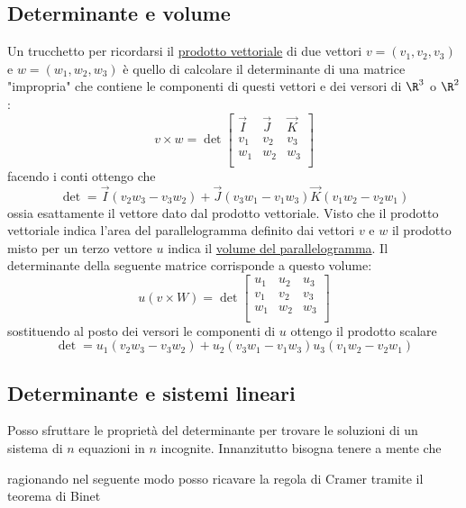 \subsection{Determinante e volume}
Un trucchetto per ricordarsi il \underline{prodotto vettoriale} di due vettori $ v= \left( v_1,v_2,v_3 \right)  $ e $ w = \left( w_1,w_2,w_3 \right)  $ è quello di calcolare il determinante di una matrice "impropria" che contiene le componenti di questi vettori e dei versori di $ \R^{3} $ o $ \R^{2} $:
\[
	v\times w = \det
	\begin{bmatrix}
		\vec{I} & \vec{J} & \vec{K} \\
		v_1     & v_2     & v_3     \\
		w_1     & w_2     & w_3     \\
	\end{bmatrix}
\]
facendo i conti ottengo che
\[
	\det = \vec{I} \left(  v_2w_3-v_3w_2 \right)  + \vec{J} \left( v_3w_1-v_1w_3 \right) \vec{K}\left( v_1w_2-v_2w_1 \right)
\]
ossia esattamente il vettore dato dal prodotto vettoriale.
\hr
Visto che il prodotto vettoriale indica l'area del parallelogramma definito dai vettori $ v $ e $ w $ il prodotto misto per un terzo vettore $ u $ indica il \underline{volume del parallelogramma}. Il determinante della seguente matrice corrisponde a questo volume:
\[
	u\left( v\times W \right)  = \det
	\begin{bmatrix}
		u_1 & u_2 & u_3 \\
		v_1 & v_2 & v_3 \\
		w_1 & w_2 & w_3 \\
	\end{bmatrix}
\]
sostituendo al posto dei versori le componenti di $ u $ ottengo il prodotto scalare
\[
	\det = u_1\left(  v_2w_3-v_3w_2 \right)  + u_2 \left( v_3w_1-v_1w_3 \right)  u_3\left( v_1w_2-v_2w_1 \right)
\]

\subsection{Determinante e sistemi lineari}
Posso sfruttare le proprietà del determinante per trovare le soluzioni di un sistema di $ n $ equazioni in $ n $ incognite. Innanzitutto bisogna tenere a mente che

\begin{center}
\end{center}

ragionando nel seguente modo posso ricavare la regola di Cramer tramite il teorema di Binet

